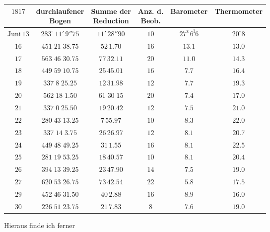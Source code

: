 \begin{center}\fontsize{9}{11}\selectfont\setlength{\tabcolsep}{3pt}\begin{tabular}{c|c|c|c|c|c}
$1817$ & \shortstack{durchlaufener\\Bogen} & \shortstack{Summe der\\Reduction} & \shortstack{Anz. d.\\Beob.} & Barometer & Thermometer\\
\hline$\text{Juni}\ 13$ & $283^\circ\,11'\,9''75$ & $11'\,28''90$ & $10$ & $27^{\mathrm z}\,6^{\mathrm l}6$ & $20^\circ8$\\
$16$ & $451\;21\;38.75$ & $52\,1.70$ & $16$ & $13.1$ & $13.0$\\
$17$ & $563\;46\;30.75$ & $77\,32.11$ & $20$ & $11.0$ & $14.3$\\
$18$ & $449\;59\;10.75$ & $25\,45.01$ & $16$ & $7.7$ & $16.4$\\
$19$ & $337\;8\;25.25$ & $12\,31.98$ & $12$ & $7.7$ & $19.3$\\
$20$ & $562\;18\;1.50$ & $61\;30\;15$ & $20$ & $7.4$ & $17.0$\\
$21$ & $337\;0\;25.50$ & $19\,20.42$ & $12$ & $7.5$ & $21.0$\\
$22$ & $280\;43\;13.25$ & $7\,55.97$ & $10$ & $8.3$ & $22.0$\\
$23$ & $337\;14\;3.75$ & $26\,26.97$ & $12$ & $8.1$ & $20.7$\\
$24$ & $449\;48\;49.25$ & $31\,1.55$ & $16$ & $8.1$ & $22.5$\\
$25$ & $281\;19\;53.25$ & $18\,40.57$ & $10$ & $8.1$ & $20.4$\\
$26$ & $394\;13\;39.25$ & $23\,47.90$ & $14$ & $7.5$ & $19.0$\\
$27$ & $620\;53\;26.75$ & $73\,42.54$ & $22$ & $5.8$ & $17.5$\\
$29$ & $452\;46\;31.50$ & $40\,2.88$ & $16$ & $8.9$ & $16.0$\\
$30$ & $226\;51\;23.75$ & $21\,7.83$ & $8$ & $7.6$ & $19.0$\\
\end{tabular}\end{center}

\par\indent Hieraus finde ich ferner

